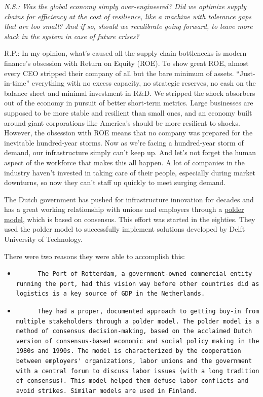 \documentclass[
]{book}
\begin{document}
\emph{N.S.: Was the global economy simply over-engineered? Did we optimize supply chains for efficiency at the cost of resilience, like a machine with tolerance gaps that are too small? And if so, should we recalibrate going forward, to leave more slack in the system in case of future crises?}

R.P.: In my opinion, what's caused all the supply chain bottlenecks is modern finance's obsession with Return on Equity (ROE). To show great ROE, almost every CEO stripped their company of all but the bare minimum of assets. ``Just-in-time'' everything with no excess capacity, no strategic reserves, no cash on the balance sheet and minimal investment in R\&D.
We stripped the shock absorbers out of the economy in pursuit of better short-term metrics.
Large businesses are supposed to be more stable and resilient than small ones, and an economy built around giant corporations like America's should be more resilient to shocks. However, the obsession with ROE means that no company was prepared for the inevitable hundred-year storms. Now as we're facing a hundred-year storm of demand, our infrastructure simply can't keep up.
And let's not forget the human aspect of the workforce that makes this all happen. A lot of companies in the industry haven't invested in taking care of their people, especially during market downturns, so now they can't staff up quickly to meet surging demand.

The Dutch government has pushed for infrastructure innovation for decades and has a great working relationship with unions and employers through a \href{https://en.wikipedia.org/wiki/Polder_model}{polder model}, which is based on consensus. This effort was started in the eighties. They used the polder model to successfully implement solutions developed by Delft University of Technology.

There were two reasons they were able to accomplish this:

\begin{itemize}
\item
\begin{verbatim}
      The Port of Rotterdam, a government-owned commercial entity running the port, had this vision way before other countries did as logistics is a key source of GDP in the Netherlands.
\end{verbatim}
\item
\begin{verbatim}
      They had a proper, documented approach to getting buy-in from multiple stakeholders through a polder model. The polder model is a method of consensus decision-making, based on the acclaimed Dutch version of consensus-based economic and social policy making in the 1980s and 1990s. The model is characterized by the cooperation between employers' organizations, labor unions and the government with a central forum to discuss labor issues (with a long tradition of consensus). This model helped them defuse labor conflicts and avoid strikes. Similar models are used in Finland.
\end{verbatim}
\end{itemize}
\end{document}
